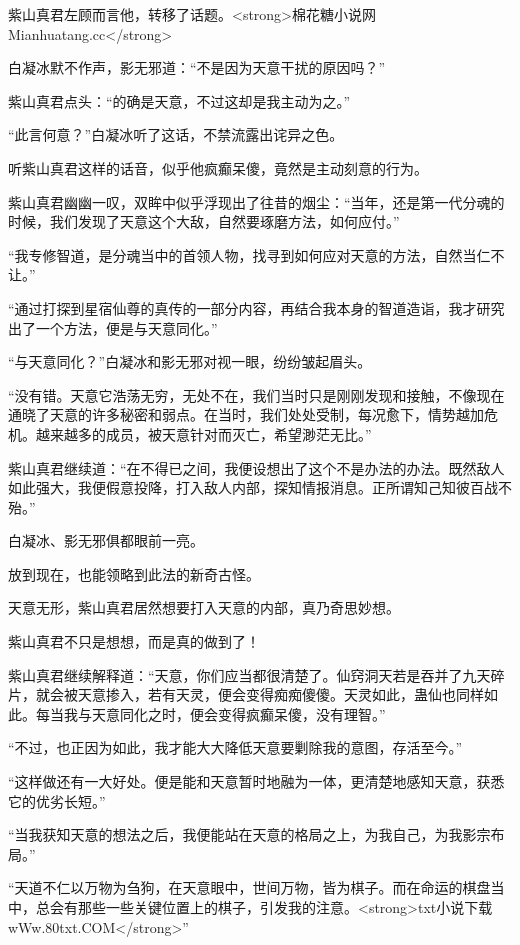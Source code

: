 
\begin{this_body}

紫山真君左顾而言他，转移了话题。<strong>棉花糖小说网Mianhuatang.cc</strong>

白凝冰默不作声，影无邪道：“不是因为天意干扰的原因吗？”

紫山真君点头：“的确是天意，不过这却是我主动为之。”

“此言何意？”白凝冰听了这话，不禁流露出诧异之色。

听紫山真君这样的话音，似乎他疯癫呆傻，竟然是主动刻意的行为。

紫山真君幽幽一叹，双眸中似乎浮现出了往昔的烟尘：“当年，还是第一代分魂的时候，我们发现了天意这个大敌，自然要琢磨方法，如何应付。”

“我专修智道，是分魂当中的首领人物，找寻到如何应对天意的方法，自然当仁不让。”

“通过打探到星宿仙尊的真传的一部分内容，再结合我本身的智道造诣，我才研究出了一个方法，便是与天意同化。”

“与天意同化？”白凝冰和影无邪对视一眼，纷纷皱起眉头。

“没有错。天意它浩荡无穷，无处不在，我们当时只是刚刚发现和接触，不像现在通晓了天意的许多秘密和弱点。在当时，我们处处受制，每况愈下，情势越加危机。越来越多的成员，被天意针对而灭亡，希望渺茫无比。”

紫山真君继续道：“在不得已之间，我便设想出了这个不是办法的办法。既然敌人如此强大，我便假意投降，打入敌人内部，探知情报消息。正所谓知己知彼百战不殆。”

白凝冰、影无邪俱都眼前一亮。

放到现在，也能领略到此法的新奇古怪。

天意无形，紫山真君居然想要打入天意的内部，真乃奇思妙想。

紫山真君不只是想想，而是真的做到了！

紫山真君继续解释道：“天意，你们应当都很清楚了。仙窍洞天若是吞并了九天碎片，就会被天意掺入，若有天灵，便会变得痴痴傻傻。天灵如此，蛊仙也同样如此。每当我与天意同化之时，便会变得疯癫呆傻，没有理智。”

“不过，也正因为如此，我才能大大降低天意要剿除我的意图，存活至今。”

“这样做还有一大好处。便是能和天意暂时地融为一体，更清楚地感知天意，获悉它的优劣长短。”

“当我获知天意的想法之后，我便能站在天意的格局之上，为我自己，为我影宗布局。”

“天道不仁以万物为刍狗，在天意眼中，世间万物，皆为棋子。而在命运的棋盘当中，总会有那些一些关键位置上的棋子，引发我的注意。<strong>txt小说下载wWw.80txt.COM</strong>”


\end{this_body}
